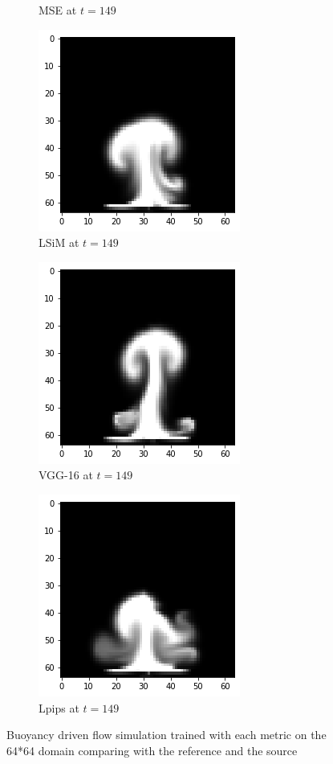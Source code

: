 \documentclass[a4paper,12pt,twoside]{report}
\begin{document}
\begin{figure}
\begin{subfigure}{0.32\textwidth}
			\caption{MSE at $t=149$}
		\end{subfigure}
		\begin{subfigure}{0.32\textwidth}
			\centering
			\includegraphics[scale=0.5]{buoyancy_low/lsim}
			\caption{LSiM at $t=149$}
		\end{subfigure}
		\begin{subfigure}{0.32\textwidth}
			\centering
			\includegraphics[scale=0.5]{buoyancy_low/vgg}
			\caption{VGG-16 at $t=149$}
		\end{subfigure}
		\begin{subfigure}{0.32\textwidth}
			\centering
			\includegraphics[scale=0.5]{buoyancy_low/lpips}
			\caption{Lpips at $t=149$}
		\end{subfigure}
		\caption{Buoyancy driven flow simulation trained with each metric on the 64*64 domain comparing with the reference and the source}
		\label{sol buoyancy low}
	\end{figure}
	
\end{document}
